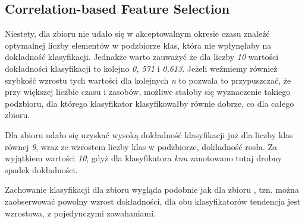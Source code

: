 \documentclass{classrep}
\begin{document}
{        \subsection{Correlation-based Feature Selection} {
            Niestety, dla zbioru \cite{dataset_letters} nie udało się w akceptowalnym
            okresie czasu znaleźć optymalnej liczby elementów w podzbiorze klas, która
            nie wpłynęłaby na dokładność klasyfikacji. Jednakże warto zauważyć że dla
            liczby \textit{10} wartości dokładności klasyfikacji to kolejno \textit{0,
            571} i \textit{0,613}. Jeżeli weźmiemy również szybkość wzrostu tych
            wartości dla kolejnych \textit{n} to pozwala to przypuszczać, że przy
            większej liczbie czasu i zasobów, możliwe stałoby się wyznaczenie takiego
            podzbioru, dla którego klasyfikator klasyfikowałby równie dobrze, co dla całego zbioru.


            Dla zbioru \cite{dataset_numerals} udało się uzyskać wysoką dokładność
            klasyfikacji już dla liczby klas równej \textit{9}, wraz ze wzrostem liczby
            klas w podzbiorze, dokładność rosła. Za wyjątkiem wartości \textit{10},
            gdyż dla klasyfikatora \textit{knn} zanotowano tutaj drobny spadek dokładności.


            Zachowanie klasyfikacji dla zbioru \cite{dataset_documents} wygląda
            podobnie jak dla zbioru \cite{dataset_letters}, tzn. można zaobserwować
            powolny wzrost dokładności, dla obu klasyfikatorów tendencja jest
            wzrostowa, z pojedynczymi zawahaniami.
        }

    }
\end{document}
